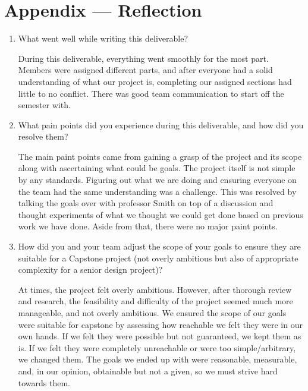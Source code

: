 \documentclass{article}
\begin{document}

\newpage{}

\section*{Appendix --- Reflection}




\begin{enumerate}
    \item What went well while writing this deliverable? 
    
    During this deliverable, everything went smoothly for the most part. 
    Members were assigned different parts, and after everyone had a solid 
    understanding of what our project is, completing our assigned sections 
    had little to no conflict. There was good team communication to start 
    off the semester with.
    
    \item What pain points did you experience during this deliverable, and how
    did you resolve them?

    The main paint points came from gaining a grasp of the project and its
    scope along with ascertaining what could be goals. The project itself is 
    not simple by any standards. Figuring out what we are doing and ensuring 
    everyone on the team had the same understanding was a challenge. This was 
    resolved by talking the goals over with professor Smith on top of a 
    discussion and thought experiments of what we thought we could get done
    based on previous work we have done. Aside from that, there were no major 
    paint points.
    
    \item How did you and your team adjust the scope of your goals to ensure
    they are suitable for a Capstone project (not overly ambitious but also of
    appropriate complexity for a senior design project)?

    At times, the project felt overly ambitious. However, after thorough review
    and research, the feasibility and difficulty of the project seemed much more
    manageable, and not overly ambitious. We ensured the scope of our goals were
    suitable for capstone by assessing how reachable we felt they were in our 
    own hands. If we felt they were possible but not guaranteed, we kept them as 
    is. If we felt they were completely unreachable or were too simple/arbitrary, 
    we changed them. The goals we ended up with were reasonable, measurable, and, 
    in our opinion, obtainable but not a given, so we must strive hard towards
    them. 
\end{enumerate}  
\end{document}

